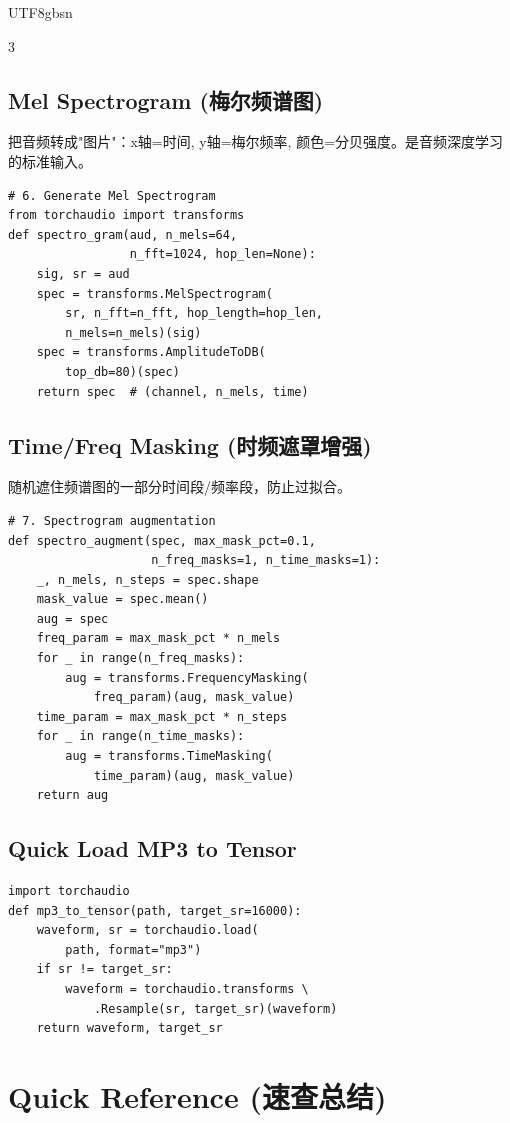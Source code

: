 \documentclass[9pt,landscape,a4paper]{article}
\newcommand{\zhint}[1]{{\scriptsize\color{gray!70!black}#1}}
\begin{document}
\begin{CJK}{UTF8}{gbsn}
\begin{multicols}{3}
\subsection{Mel Spectrogram \zhint{(梅尔频谱图)}}
\zhint{把音频转成"图片"：x轴=时间, y轴=梅尔频率, 颜色=分贝强度。是音频深度学习的标准输入。}

\begin{lstlisting}
# 6. Generate Mel Spectrogram
from torchaudio import transforms
def spectro_gram(aud, n_mels=64,
                 n_fft=1024, hop_len=None):
    sig, sr = aud
    spec = transforms.MelSpectrogram(
        sr, n_fft=n_fft, hop_length=hop_len,
        n_mels=n_mels)(sig)
    spec = transforms.AmplitudeToDB(
        top_db=80)(spec)
    return spec  # (channel, n_mels, time)
\end{lstlisting}

\subsection{Time/Freq Masking \zhint{(时频遮罩增强)}}
\zhint{随机遮住频谱图的一部分时间段/频率段，防止过拟合。}

\begin{lstlisting}
# 7. Spectrogram augmentation
def spectro_augment(spec, max_mask_pct=0.1,
                    n_freq_masks=1, n_time_masks=1):
    _, n_mels, n_steps = spec.shape
    mask_value = spec.mean()
    aug = spec
    freq_param = max_mask_pct * n_mels
    for _ in range(n_freq_masks):
        aug = transforms.FrequencyMasking(
            freq_param)(aug, mask_value)
    time_param = max_mask_pct * n_steps
    for _ in range(n_time_masks):
        aug = transforms.TimeMasking(
            time_param)(aug, mask_value)
    return aug
\end{lstlisting}

\subsection{Quick Load MP3 to Tensor}
\begin{lstlisting}
import torchaudio
def mp3_to_tensor(path, target_sr=16000):
    waveform, sr = torchaudio.load(
        path, format="mp3")
    if sr != target_sr:
        waveform = torchaudio.transforms \
            .Resample(sr, target_sr)(waveform)
    return waveform, target_sr
\end{lstlisting}

\section{Quick Reference \zhint{(速查总结)}}


\end{multicols}
\end{CJK}
\end{document}

